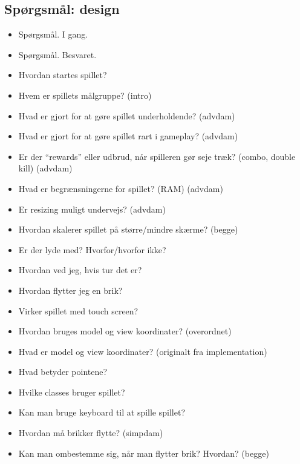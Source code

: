 \subsection{Spørgsmål: design}
\begin{itemize}
    \item Spørgsmål. I gang. \C
    \item Spørgsmål. Besvaret. \CT 
    \\
    \item Hvordan startes spillet? \CT
    \item Hvem er spillets målgruppe? (intro) \CT
    \item Hvad er gjort for at gøre spillet underholdende?  (advdam) \CT
    \item Hvad er gjort for at gøre spillet rart i gameplay?  (advdam) \CT
    \item Er der “rewards” eller udbrud, når spilleren gør seje træk? (combo, double kill) (advdam) \C
    \item Hvad er begrænsningerne for spillet? (RAM) (advdam) \CT
    \item Er resizing muligt undervejs? (advdam) \CT
    \item Hvordan skalerer spillet på større/mindre skærme? (begge) \CT
    \item Er der lyde med? Hvorfor/hvorfor ikke? \CT
    \item Hvordan ved jeg, hvis tur det er? \CT
    \item Hvordan flytter jeg en brik? \CT
    \item Virker spillet med touch screen? \CT
    
    \item Hvordan bruges model og view koordinater? (overordnet) \CT
    \item Hvad er model og view koordinater? (originalt fra implementation) \CT
    
    \item Hvad betyder pointene? \CT
    
    \item Hvilke classes bruger spillet? \CT
    
    \item Kan man bruge keyboard til at spille spillet? \CT
    \item Hvordan må brikker flytte? (simpdam) \CT
    
    \item Kan man ombestemme sig, når man flytter brik? Hvordan? (begge) \CT
    

\end{itemize}
